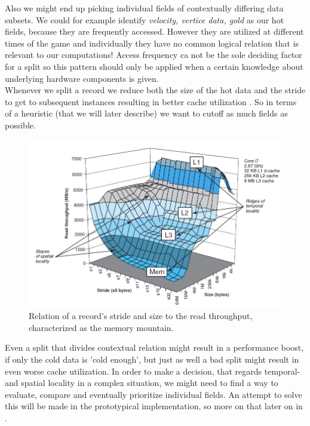 Also we might end up picking individual fields of contextually differing data subsets. We could for example identify \textit{velocity, vertice data, gold} as our hot fields, because they are frequently accessed. However they are utilized at different times of the game and individually they have no common logical relation that is relevant to our computations! Access frequency ca not be the sole deciding factor for a split so this pattern should only be applied when a certain knowledge about underlying hardware components is given.\\
Whenever we split a record we reduce both the size of the hot data and the stride to get to subsequent instances resulting in better cache utilization . So in terms of a heuristic (that we will later describe) we want to cutoff as much fields as possible.
\begin{figure}[!htbp]
	\centering
	\includegraphics[width=\textwidth, height=0.5\textwidth]{PICs/memory_mountain}
	\caption{Relation of a record's stride and size to the read throughput, characterized as the memory mountain. }\label{memory_mountain}
\end{figure}
Even a split that divides contextual relation might result in a performance boost, if only the cold data is 'cold enough', but just as well a bad split might result in even worse cache utilization.
In order to make a decision, that regards temporal- and spatial locality in a complex situation, we might need to find a way to evaluate, compare and eventually prioritize individual fields. An attempt to solve this will be made in the prototypical implementation, so more on that later on in .

